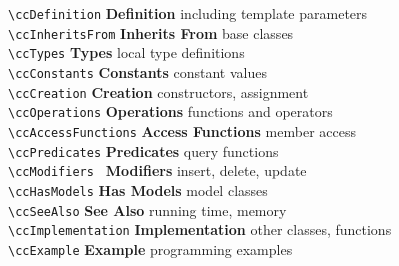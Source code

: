 \begin{tabbing}
  \> \verb+\ccDefinition+      \>  {\bf Definition}    \>
                                          including template parameters\\ %
  \> \verb+\ccInheritsFrom+    \>  {\bf Inherits From}     \>
                                                     base classes\\ %
  \> \verb+\ccTypes+           \>  {\bf Types}         \>
                                                     local type definitions\\ %
  \> \verb+\ccConstants+       \>  {\bf Constants}     \>
                                                     constant values\\ %
  \> \verb+\ccCreation+        \>  {\bf Creation}      \>
                                                     constructors, assignment\\ %
  \> \verb+\ccOperations+      \>  {\bf Operations}    \>
                                                     functions and operators\\ %
  \> \verb+\ccAccessFunctions+ \>  {\bf Access Functions}    \>
                                                     member access\\ %
  \> \verb+\ccPredicates+      \>  {\bf Predicates}    \>
                                                     query functions\\%
  \> \verb+\ccModifiers +      \>  {\bf Modifiers}    \>
                                                     insert, delete, update\\%
  \> \verb+\ccHasModels+       \>  {\bf Has Models}\>
                                                     model classes\\%
  \> \verb+\ccSeeAlso+         \>  {\bf See Also}\>
                                                     running time, memory\\%
  \> \verb+\ccImplementation+  \>  {\bf Implementation}\>
                                                     other classes, functions\\%
  \> \verb+\ccExample+         \>  {\bf Example}       \>
                                                     programming examples%
\end{tabbing}



